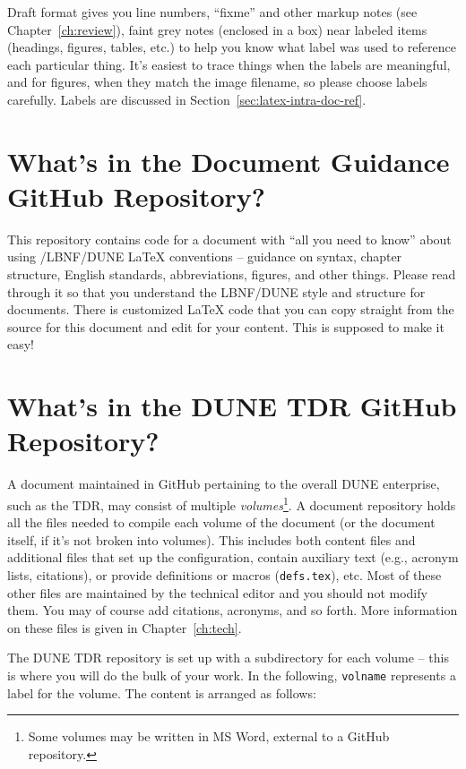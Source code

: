 Draft format gives you line numbers, ``fixme'' and other markup notes (see Chapter~\ref{ch:review}), 
faint grey notes (enclosed in a box) near labeled items (headings, figures, tables, etc.) to help you know 
what label was used to reference each particular thing.  
It's easiest to trace things when the labels are meaningful, and for figures, when they match the image filename, so please choose labels carefully. Labels are discussed in Section~\ref{sec:latex-intra-doc-ref}.

\section{What's in the Document Guidance GitHub Repository?}
\label{sec:gen-guidance-repo}

This repository contains code for a document with ``all you need to know'' about using /LBNF/DUNE \LaTeX{}  conventions  -- guidance on syntax, chapter structure, English standards, abbreviations, figures, and other things. Please read through it so that you understand the LBNF/DUNE style and structure for documents.  There is customized \LaTeX{} code that you can copy straight from the source for this document and edit for your content.  This is supposed to make it easy!


\section{What's in the DUNE TDR GitHub Repository?}
\label{sec:gen-repo}

A document maintained in GitHub pertaining to the overall DUNE enterprise, such as the TDR, may consist of multiple \textit{volumes}\footnote{Some volumes may be written in MS Word, external to a GitHub repository.}.  A document repository holds all the files needed to compile each volume of the document (or the document itself, if it's not broken into volumes). This includes both content files and additional files that set up the configuration, 
contain auxiliary text (e.g., acronym lists, citations), or provide definitions or macros (\texttt{defs.tex}), etc.  Most of these other files are maintained by the technical editor and you should not modify them. You may of course add citations, acronyms, and so forth.   More information on these files is given in Chapter~\ref{ch:tech}.

The DUNE TDR repository is set up with a subdirectory for each volume -- this is where you will do the bulk of your work. In the following, \texttt{volname} represents a label for the volume. The content is
arranged as follows:

